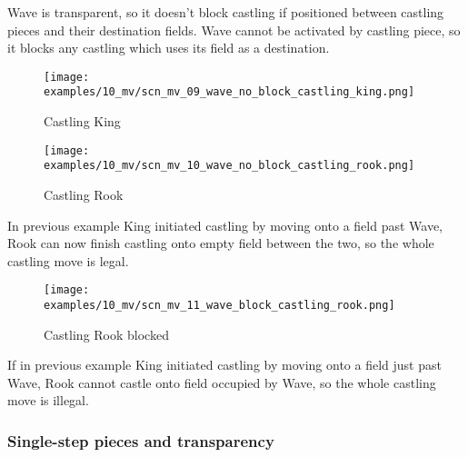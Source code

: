 \vspace*{-0.4\baselineskip}
Wave is transparent, so it doesn't block castling if positioned between castling
pieces and their destination fields. Wave cannot be activated by castling piece,
so it blocks any castling which uses its field as a destination.

\vspace*{-0.4\baselineskip}
\noindent
\begin{figure}[!h]
\texttt{[image: examples/10\_mv/scn\_mv\_09\_wave\_no\_block\_castling\_king.png]}
\vspace*{-1.4\baselineskip}
\caption{Castling King}
\label{fig:scn_mv_09_wave_no_block_castling_king}
\end{figure}

\vspace*{-1.4\baselineskip}
\noindent
\begin{figure}[!h]
\texttt{[image: examples/10\_mv/scn\_mv\_10\_wave\_no\_block\_castling\_rook.png]}
\vspace*{-1.4\baselineskip}
\caption{Castling Rook}
\label{fig:scn_mv_10_wave_no_block_castling_rook}
\end{figure}

\vspace*{-0.4\baselineskip}
In previous example King initiated castling by moving onto a field past Wave, Rook
can now finish castling onto empty field between the two, so the whole castling move
is legal.

\vspace*{-0.4\baselineskip}
\noindent
\begin{figure}[!h]
\texttt{[image: examples/10\_mv/scn\_mv\_11\_wave\_block\_castling\_rook.png]}
\vspace*{-1.4\baselineskip}
\caption{Castling Rook blocked}
\label{fig:scn_mv_11_wave_block_castling_rook}
\end{figure}

\vspace*{-0.4\baselineskip}
If in previous example King initiated castling by moving onto a field just past Wave,
Rook cannot castle onto field occupied by Wave, so the whole castling move is illegal.

\clearpage %

\subsubsection*{Single-step pieces and transparency}
\label{sec:Miranda's veil/Wave/Cascading Waves/Single-step pieces and transparency}

